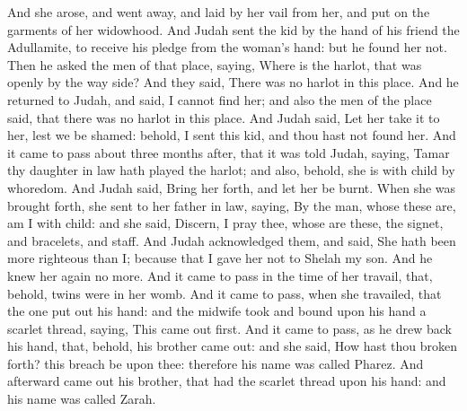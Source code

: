 \begin{biblechapter}
\verse And she arose, and went away, and laid by her vail from her, and put on the garments of her widowhood.
\verse And Judah sent the kid by the hand of his friend the Adullamite, to receive his pledge from the woman's hand: but he found her not.
\verse Then he asked the men of that place, saying, Where is the harlot, that was openly by the way side? And they said, There was no harlot in this place.
\verse And he returned to Judah, and said, I cannot find her; and also the men of the place said, that there was no harlot in this place.
\verse And Judah said, Let her take it to her, lest we be shamed: behold, I sent this kid, and thou hast not found her.
\verse And it came to pass about three months after, that it was told Judah, saying, Tamar thy daughter in law hath played the harlot; and also, behold, she is with child by whoredom. And Judah said, Bring her forth, and let her be burnt.
\verse When she was brought forth, she sent to her father in law, saying, By the man, whose these are, am I with child: and she said, Discern, I pray thee, whose are these, the signet, and bracelets, and staff.
\verse And Judah acknowledged them, and said, She hath been more righteous than I; because that I gave her not to Shelah my son. And he knew her again no more.
\verse And it came to pass in the time of her travail, that, behold, twins were in her womb.
\verse And it came to pass, when she travailed, that the one put out his hand: and the midwife took and bound upon his hand a scarlet thread, saying, This came out first.
\verse And it came to pass, as he drew back his hand, that, behold, his brother came out: and she said, How hast thou broken forth? this breach be upon thee: therefore his name was called Pharez.
\verse And afterward came out his brother, that had the scarlet thread upon his hand: and his name was called Zarah.
\end{biblechapter}

